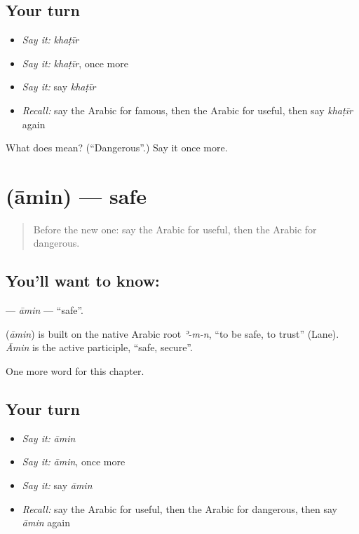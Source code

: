 \subsection*{Your turn}
\begin{itemize}
\raggedright
  \item \emph{Say it:} \emph{khaṭīr}
  \item \emph{Say it:} \emph{khaṭīr}, once more
  \item \emph{Say it:} say \emph{khaṭīr}
  \item \emph{Recall:} say the Arabic for famous, then the Arabic for useful, then say \emph{khaṭīr} again
\end{itemize}

\begin{tcolorbox}[breakable,colback=teal!4,colframe=teal!35!black,title={Before you move on}]
What does  mean? (\textquotedblleft{}Dangerous\textquotedblright{}.) Say it once more.
\end{tcolorbox}
\section[\texorpdfstring{\ar{آمن} (āmin)}{آمن (āmin)}]{ (āmin) — safe}

\label{lesson:AR-C146-amin}



\begin{quote}
Before the new one: say the Arabic for useful, then the Arabic for dangerous.
\end{quote}

\subsection*{You'll want to know: }
\textbf{} — \emph{āmin} — \textquotedblleft{}safe\textquotedblright{}.

\begin{cousinweb}
\textbf{} (\emph{āmin}) is built on the native Arabic root \emph{ʾ-m-n}, \textquotedblleft{}to be safe, to trust\textquotedblright{} (Lane). \emph{Āmin} is the active participle, \textquotedblleft{}safe, secure\textquotedblright{}.
\end{cousinweb}

\begin{grammarlens}[title={What you've built}]
One more word for this chapter.
\end{grammarlens}

\subsection*{Your turn}
\begin{itemize}
\raggedright
  \item \emph{Say it:} \emph{āmin}
  \item \emph{Say it:} \emph{āmin}, once more
  \item \emph{Say it:} say \emph{āmin}
  \item \emph{Recall:} say the Arabic for useful, then the Arabic for dangerous, then say \emph{āmin} again
\end{itemize}

